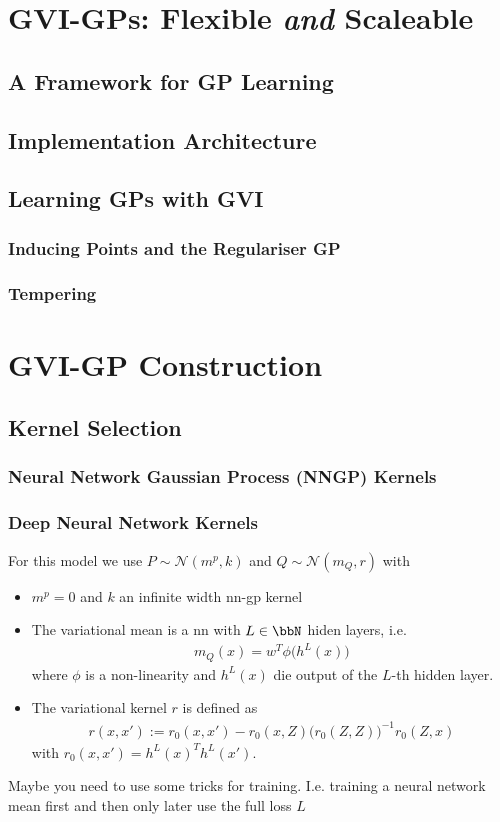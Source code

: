 \documentclass{article}
\numberwithin{equation}{section}
\begin{document}
\newpage
\section{GVI-GPs: Flexible \textit{and} Scaleable}
\subsection{A Framework for GP Learning}
\subsection{Implementation Architecture}
\subsection{Learning GPs with GVI}
\subsubsection{Inducing Points and the Regulariser GP}
\subsubsection{Tempering}


\newpage
\section{GVI-GP Construction}
\subsection{Kernel Selection}
\subsubsection{Neural Network Gaussian Process (NNGP) Kernels}
\subsubsection{Deep Neural Network Kernels}
For this model we use $P \sim \mathcal{N}(m^p, k) $ and $Q \sim \mathcal{N}(m_Q, r)$ with 
\begin{itemize}
    \item $m^p = 0$ and $k$ an infinite width nn-gp kernel
    \item The variational mean is a nn with $L \in \bbN$ hiden layers, i.e. 
    \begin{align}
        m_Q(x) = w^T \phi\big( h^{L}(x) \big)
    \end{align}
    where $\phi$ is a non-linearity and $h^L(x)$ die output of the $L$-th hidden layer. 
    \item 
    The variational kernel $r$ is defined as 
    \begin{align}
        r(x,x') := r_0(x,x') - r_0(x,Z) \big( r_0(Z,Z) \big)^{-1} r_0(Z,x)
    \end{align}
    with $r_0(x,x') = h^{L}(x)^T h^{L}(x')$.
\end{itemize}
Maybe you need to use some tricks for training. I.e. training a neural network mean first and then only later use the full loss $L$
\end{document}
